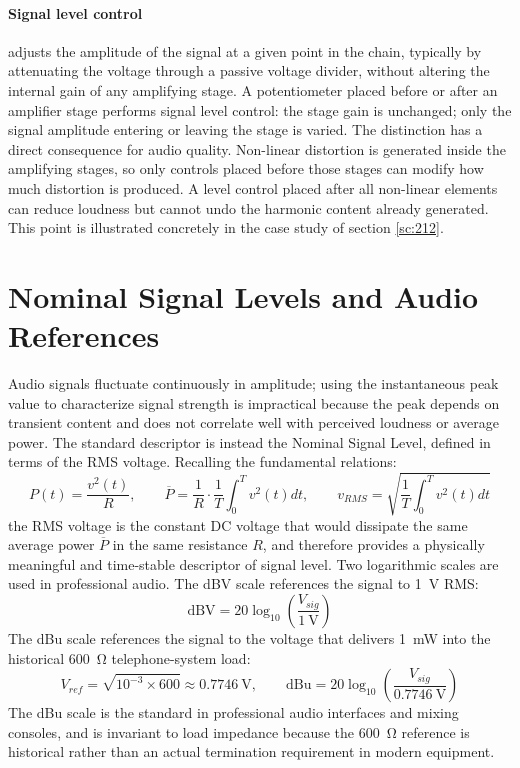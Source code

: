 \paragraph{Signal level control} adjusts the amplitude of the signal at a given point in the chain, typically by attenuating the voltage through a passive voltage divider, without altering the internal gain of any amplifying stage. A potentiometer placed before or after an amplifier stage performs signal level control: the stage gain is unchanged; only the signal amplitude entering or leaving the stage is varied. The distinction has a direct consequence for audio quality. Non-linear distortion is generated inside the amplifying stages, so only controls placed before those stages can modify how much distortion is produced. A level control placed after all non-linear elements can reduce loudness but cannot undo the harmonic content already generated. This point is illustrated concretely in the case study of section \ref{sc:212}.

\section{Nominal Signal Levels and Audio References}
\label{sc:211}

Audio signals fluctuate continuously in amplitude; using the instantaneous peak value to characterize signal strength is impractical because the peak depends on transient content and does not correlate well with perceived loudness or average power. The standard descriptor is instead the Nominal Signal Level, defined in terms of the RMS voltage.
Recalling the fundamental relations:
\[
P(t) = \frac{v^2(t)}{R},
\qquad
\overline{P} = \frac{1}{R}\cdot\frac{1}{T}\int_0^T v^2(t) dt,
\qquad
v_{RMS} = \sqrt{\frac{1}{T}\int_0^T v^2(t) dt}
\]
the RMS voltage is the constant DC voltage that would dissipate the same average power \( \overline{P} \) in the same resistance \( R \), and therefore provides a physically meaningful and time-stable descriptor of signal level. Two logarithmic scales are used in professional audio.
The dBV scale references the signal to \SI{1}{\volt} RMS:
\[
\mathrm{dBV} = 20\log_{10} \left(\frac{V_{sig}}{\SI{1}{\volt}}\right)
\]
The dBu scale references the signal to the voltage that delivers \SI{1}{\milli\watt} into the historical \SI{600}{\ohm} telephone-system load:
\[
V_{ref} = \sqrt{10^{-3}\times 600} \approx \SI{0.7746}{\volt},
\qquad
\mathrm{dBu} = 20\log_{10} \left(\frac{V_{sig}}{\SI{0.7746}{\volt}}\right)
\]
The dBu scale is the standard in professional audio interfaces and mixing consoles, and is invariant to load impedance because the \SI{600}{\ohm} reference is historical rather than an actual termination requirement in modern equipment.

